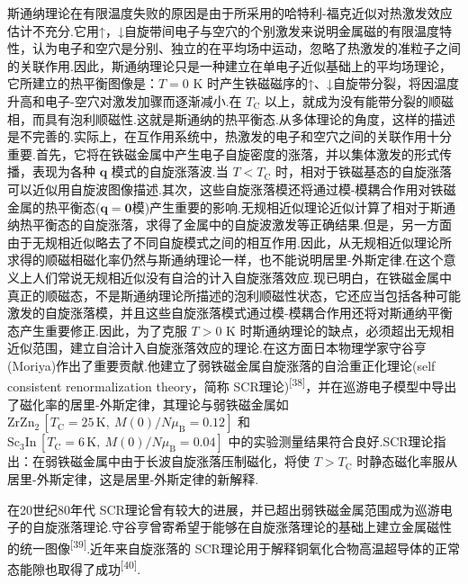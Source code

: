 斯通纳理论在有限温度失败的原因是由于所采用的哈特利-福克近似对热激发效应估计不充分.它用↑，↓自旋带间电子与空穴的个别激发来说明金属磁的有限温度特性，认为电子和空穴是分别、独立的在平均场中运动，忽略了热激发的准粒子之间的关联作用.因此，斯通纳理论只是一种建立在单电子近似基础上的平均场理论，它所建立的热平衡图像是：$T=0$ K 时产生铁磁磁序的↑、↓自旋带分裂，将因温度升高和电子-空穴对激发加骤而逐渐减小.在 $T_{\mathrm{C}}$ 以上，就成为没有能带分裂的顺磁相，而具有泡利顺磁性.这就是斯通纳的热平衡态.从多体理论的角度，这样的描述是不完善的.实际上，在互作用系统中，热激发的电子和空穴之间的关联作用十分重要.首先，它将在铁磁金属中产生电子自旋密度的涨落，并以集体激发的形式传播，表现为各种 $\boldsymbol{q}$ 模式的自旋涨落波.当 $T<T_{\mathrm{C}}$ 时，相对于铁磁基态的自旋涨落可以近似用自旋波图像描述.其次，这些自旋涨落模还将通过模-模耦合作用对铁磁金属的热平衡态($\boldsymbol{q}=\boldsymbol{0}$模)产生重要的影响.无规相近似理论近似计算了相对于斯通纳热平衡态的自旋涨落，求得了金属中的自旋波激发等正确结果.但是，另一方面由于无规相近似略去了不同自旋模式之间的相互作用.因此，从无规相近似理论所求得的顺磁相磁化率仍然与斯通纳理论一样，也不能说明居里-外斯定律.在这个意义上人们常说无规相近似没有自洽的计入自旋涨落效应.现已明白，在铁磁金属中真正的顺磁态，不是斯通纳理论所描述的泡利顺磁性状态，它还应当包括各种可能激发的自旋涨落模，并且这些自旋涨落模式通过模-模耦合作用还将对斯通纳平衡态产生重要修正.因此，为了克服 $T>0$ K 时斯通纳理论的缺点，必须超出无规相近似范围，建立自洽计入自旋涨落效应的理论.在这方面日本物理学家守谷亨(Moriya)作出了重要贡献.他建立了弱铁磁金属自旋涨落的自洽重正化理论(self consistent renormalization theory，简称 SCR理论)\textsuperscript{[38]}，并在巡游电子模型中导出了磁化率的居里-外斯定律，其理论与弱铁磁金属如 $\mathrm{ZrZn_{2}}\,[T_{\mathrm{C}}=25\,\mathrm{K},\ M(0)/N\mu_{\mathrm{B}}=0.12]$ 和 $\mathrm{Sc_{3}In}\,[T_{\mathrm{C}}=6\,\mathrm{K},\ M(0)/N\mu_{\mathrm{B}}=0.04]$ 中的实验测量结果符合良好.SCR理论指出：在弱铁磁金属中由于长波自旋涨落压制磁化，将使 $T>T_{\mathrm{C}}$ 时静态磁化率服从居里-外斯定律，这是居里-外斯定律的新解释.

在20世纪80年代 SCR理论曾有较大的进展，并已超出弱铁磁金属范围成为巡游电子的自旋涨落理论.守谷亨曾寄希望于能够在自旋涨落理论的基础上建立金属磁性的统一图像\textsuperscript{[39]}.近年来自旋涨落的 SCR理论用于解释铜氧化合物高温超导体的正常态能隙也取得了成功\textsuperscript{[40]}.

